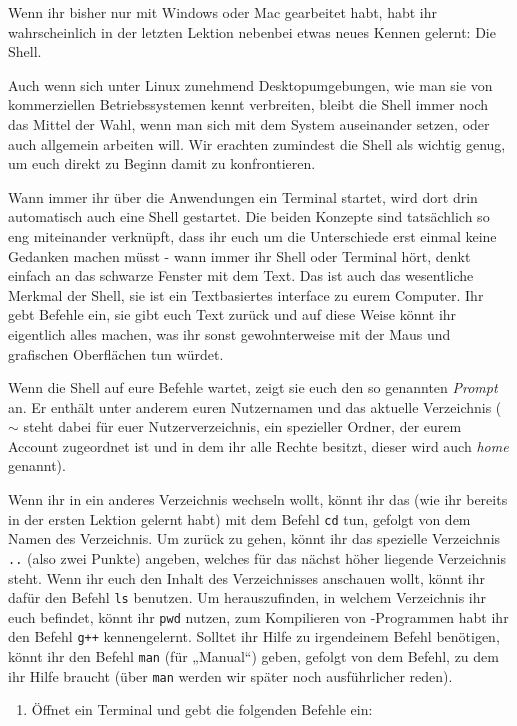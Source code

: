 
Wenn ihr bisher nur mit Windows oder Mac gearbeitet habt, habt ihr
wahrscheinlich in der letzten Lektion nebenbei etwas neues Kennen gelernt: Die
Shell.

Auch wenn sich unter Linux zunehmend Desktopumgebungen, wie man sie von
kommerziellen Betriebssystemen kennt verbreiten, bleibt die Shell immer noch das
Mittel der Wahl, wenn man sich mit dem System auseinander setzen, oder auch
allgemein arbeiten will. Wir erachten zumindest die Shell als wichtig genug, um
euch direkt zu Beginn damit zu konfrontieren.

Wann immer ihr über die Anwendungen ein Terminal startet, wird dort drin
automatisch auch eine Shell gestartet. Die beiden Konzepte sind tatsächlich so
eng miteinander verknüpft, dass ihr euch um die Unterschiede erst einmal keine
Gedanken machen müsst - wann immer ihr Shell oder Terminal hört, denkt einfach
an das schwarze Fenster mit dem Text. Das ist auch das wesentliche Merkmal der
Shell, sie ist ein Textbasiertes interface zu eurem Computer. Ihr gebt Befehle
ein, sie gibt euch Text zurück und auf diese Weise könnt ihr eigentlich alles
machen, was ihr sonst gewohnterweise mit der Maus und grafischen Oberflächen
tun würdet.

Wenn die Shell auf eure Befehle wartet, zeigt sie euch den so genannten
\emph{Prompt} an. Er enthält unter anderem euren Nutzernamen und das aktuelle
Verzeichnis ($\sim$ steht dabei für euer Nutzerverzeichnis, ein spezieller
Ordner, der eurem Account zugeordnet ist und in dem ihr alle Rechte besitzt,
dieser wird auch \emph{home} genannt).

Wenn ihr in ein anderes Verzeichnis wechseln wollt, könnt ihr das (wie ihr
bereits in der ersten Lektion gelernt habt) mit dem Befehl \texttt{cd} tun,
gefolgt von dem Namen des Verzeichnis. Um zurück zu gehen, könnt ihr das
spezielle Verzeichnis \texttt{..} (also zwei Punkte) angeben, welches für das
nächst höher liegende Verzeichnis steht. Wenn ihr euch den Inhalt des
Verzeichnisses anschauen wollt, könnt ihr dafür den Befehl \texttt{ls}
benutzen. Um herauszufinden, in welchem Verzeichnis ihr euch befindet, könnt
ihr \texttt{pwd} nutzen, zum Kompilieren von \Cpp-Programmen habt ihr den Befehl
\texttt{g++} kennengelernt. Solltet ihr Hilfe zu irgendeinem Befehl benötigen,
könnt ihr den Befehl \texttt{man} (für „Manual“) geben, gefolgt von dem Befehl,
zu dem ihr Hilfe braucht (über \texttt{man} werden wir später noch
ausführlicher reden).

\begin{praxis}
    \begin{enumerate}
        \item Öffnet ein Terminal und gebt die folgenden Befehle ein:
    \end{enumerate}
\end{praxis}

